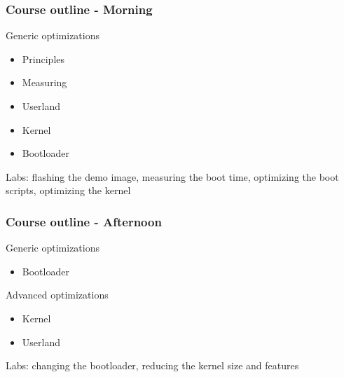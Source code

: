 \begin{frame}
\frametitle{Course outline - Morning}
Generic optimizations
\begin{itemize}
\item Principles
\item Measuring
\item Userland
\item Kernel
\item Bootloader
\end{itemize}
Labs: flashing the demo image, measuring the boot time, optimizing the
boot scripts, optimizing the kernel
\end{frame}

\begin{frame}
\frametitle{Course outline - Afternoon}
Generic optimizations
\begin{itemize}
\item Bootloader
\end{itemize}
Advanced optimizations
\begin{itemize}
\item Kernel
\item Userland
\end{itemize}
Labs: changing the bootloader, reducing the kernel size and features
\end{frame}

